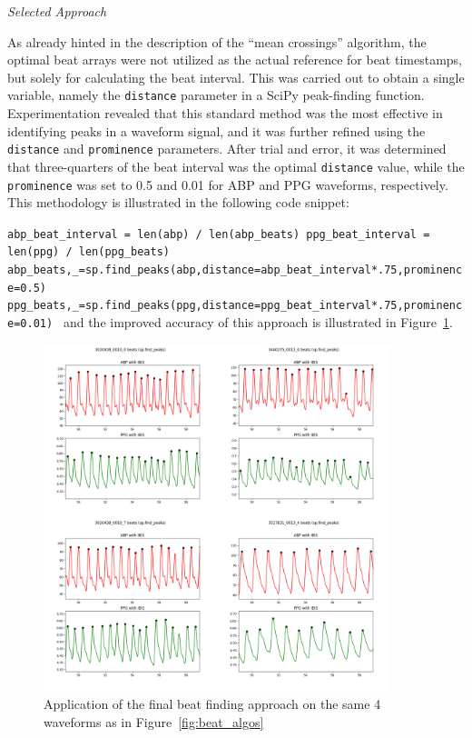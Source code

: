 \vspace{0.2cm}
\textit{Selected Approach}
\vspace{0.2cm}

As already hinted in the description of the \enquote{mean crossings} algorithm, the optimal beat arrays were not utilized as the actual reference for beat timestamps, but solely for calculating the beat interval.
This was carried out to obtain a single variable, namely the \texttt{distance} parameter in a SciPy peak-finding function.
Experimentation revealed that this standard method was the most effective in identifying peaks in a waveform signal, and it was further refined using the \texttt{distance} and \texttt{prominence} parameters.
After trial and error, it was determined that three-quarters of the beat interval was the optimal \texttt{distance} value, while the \texttt{prominence} was set to 0.5 and 0.01 for ABP and PPG waveforms, respectively.
This methodology is illustrated in the following code snippet:

\vspace{0.1cm}
{\centering \texttt{abp\_beat\_interval = len(abp) / len(abp\_beats) \newline
ppg\_beat\_interval = len(ppg) / len(ppg\_beats) \newline
abp\_beats,\_=sp.find\_peaks(abp,distance=abp\_beat\_interval*.75,prominence=0.5) \newline
ppg\_beats,\_=sp.find\_peaks(ppg,distance=ppg\_beat\_interval*.75,prominence=0.01) \newline}}
\vspace{0.1cm}
\noindent and the improved accuracy of this approach is illustrated in Figure~\ref{fig:sp_beats}.

\begin{figure}[h]
    \includegraphics[width=0.9\textwidth]{images/methods/sp_beats}
    \caption{Application of the final beat finding approach on the same 4 waveforms as in Figure~\ref{fig:beat_algos}}
    \label{fig:sp_beats}
\end{figure}

